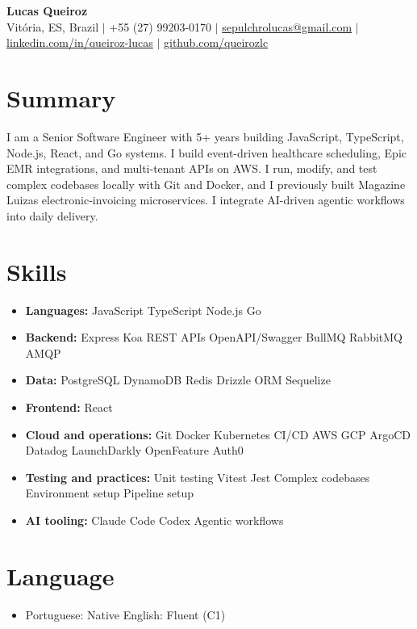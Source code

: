 \documentclass[letterpaper,10pt]{article}
\newcommand{\resumeItem}[1]{\item\small{#1}}
\newcommand{\resumeSubHeadingList}{\begin{itemize}[leftmargin=0.15in, label={}, nosep]}
\newcommand{\resumeSubHeadingListEnd}{\end{itemize}}
\begin{document}
\begin{center}
  \textbf{\Huge Lucas Queiroz} \\[3pt]
  \small Vit\'oria, ES, Brazil $|$ +55 (27) 99203-0170 $|$ \href{mailto:sepulchrolucas@gmail.com}{sepulchrolucas@gmail.com} $|$
  \href{https://linkedin.com/in/queiroz-lucas}{linkedin.com/in/queiroz-lucas} $|$
  \href{https://github.com/queirozlc}{github.com/queirozlc}
\end{center}
\vspace{2pt}

\section{Summary}
I am a Senior Software Engineer with 5+ years building JavaScript, TypeScript, Node.js, React, and Go systems. I build event-driven healthcare scheduling, Epic EMR integrations, and multi-tenant APIs on AWS. I run, modify, and test complex codebases locally with Git and Docker, and I previously built Magazine Luiza\textquotesingle{}s electronic-invoicing microservices. I integrate AI-driven agentic workflows into daily delivery.

\section{Skills}
\resumeSubHeadingList
\resumeItem{\textbf{Languages:} JavaScript \textbar{} TypeScript \textbar{} Node.js \textbar{} Go}
\resumeItem{\textbf{Backend:} Express \textbar{} Koa \textbar{} REST APIs \textbar{} OpenAPI/Swagger \textbar{} BullMQ \textbar{} RabbitMQ \textbar{} AMQP}
\resumeItem{\textbf{Data:} PostgreSQL \textbar{} DynamoDB \textbar{} Redis \textbar{} Drizzle ORM \textbar{} Sequelize}
\resumeItem{\textbf{Frontend:} React}
\resumeItem{\textbf{Cloud and operations:} Git \textbar{} Docker \textbar{} Kubernetes \textbar{} CI/CD \textbar{} AWS \textbar{} GCP \textbar{} ArgoCD \textbar{} Datadog \textbar{} LaunchDarkly \textbar{} OpenFeature \textbar{} Auth0}
\resumeItem{\textbf{Testing and practices:} Unit testing \textbar{} Vitest \textbar{} Jest \textbar{} Complex codebases \textbar{} Environment setup \textbar{} Pipeline setup}
\resumeItem{\textbf{AI tooling:} Claude Code \textbar{} Codex \textbar{} Agentic workflows}
\resumeSubHeadingListEnd

\section{Language}
\resumeSubHeadingList
\resumeItem{Portuguese: Native \textbar{} English: Fluent (C1)}
\resumeSubHeadingListEnd
\end{document}
